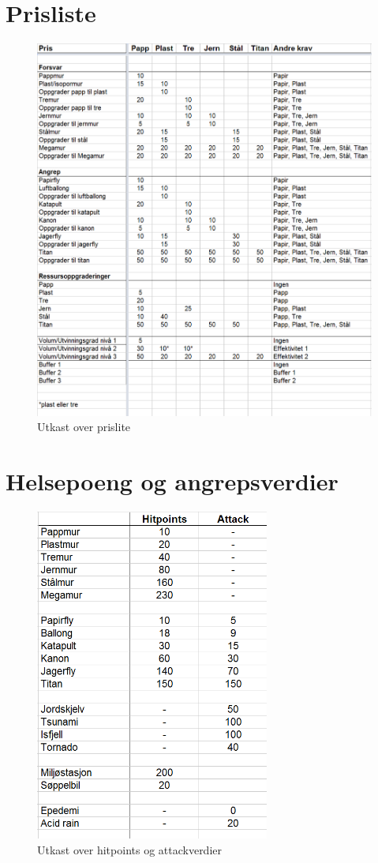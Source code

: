 \appendix {} \pagestyle{plain}
\section{Prisliste} \label{A}

			\begin{figure} [H]
				\begin{center}
				\includegraphics[width=155mm]{images/prisliste_stor}
				\caption{Utkast over prislite}
				\end{center}
			\end{figure}

\section{Helsepoeng og angrepsverdier} \label{B}

			\begin{figure} [H]
				\begin{center}
					\includegraphics[width=77mm]{images/hitpoints_attack_stor}
				\end{center}
				\caption{Utkast over hitpoints og attackverdier}
			\end{figure}
